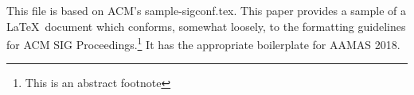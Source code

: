 This file is based on ACM's sample-sigconf.tex.
This paper provides a sample of a \LaTeX\ document which conforms,
somewhat loosely, to the formatting guidelines for
ACM SIG Proceedings.\footnote{This is an abstract footnote}
It has the appropriate boilerplate for AAMAS 2018.
